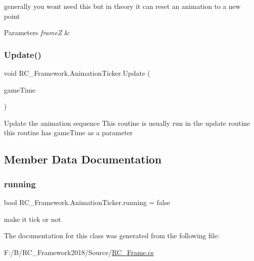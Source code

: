 generally you wont need this but in theory it can reset an animation to a new point 


\begin{DoxyParams}{Parameters}
{\em frameZ} & \\
\hline
\end{DoxyParams}
\mbox{\label{class_r_c___framework_1_1_animation_ticker_a6d859fd88b02f11b5ce36d72f307f2da}} 
\subsubsection{\texorpdfstring{Update()}{Update()}}
{\footnotesize\ttfamily void R\+C\+\_\+\+Framework.\+Animation\+Ticker.\+Update (\begin{DoxyParamCaption}\item[{Game\+Time}]{game\+Time }\end{DoxyParamCaption})}



Update the animation sequence This routine is usually run in the update routine this routine has game\+Time as a parameter 



\subsection{Member Data Documentation}
\mbox{\label{class_r_c___framework_1_1_animation_ticker_aa510bfceffc13acf2a6175094794d783}} 
\subsubsection{\texorpdfstring{running}{running}}
{\footnotesize\ttfamily bool R\+C\+\_\+\+Framework.\+Animation\+Ticker.\+running = false}



make it tick or not 



The documentation for this class was generated from the following file\+:\begin{DoxyCompactItemize}
\item 
F\+:/\+B/\+R\+C\+\_\+\+Framework2018/\+Source/\mbox{\hyperlink{_r_c___frame_8cs}{R\+C\+\_\+\+Frame.\+cs}}\end{DoxyCompactItemize}

